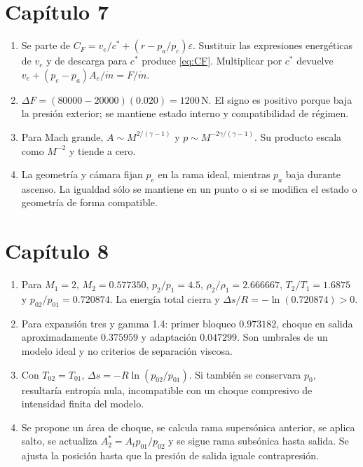 \section*{Capítulo 7}
\begin{enumerate}
\item Se parte de $C_F=v_e/c^*+(r-p_a/p_c)\varepsilon$. Sustituir las expresiones energéticas de $v_e$ y de descarga para $c^*$ produce \eqref{eq:CF}. Multiplicar por $c^*$ devuelve $v_e+(p_e-p_a)A_e/\dot m=F/\dot m$.
\item $\Delta F=(80000-20000)(0.020)=1200\,\mathrm N$. El signo es positivo porque baja la presión exterior; se mantiene estado interno y compatibilidad de régimen.
\item Para Mach grande, $A\sim M^{2/(\gamma-1)}$ y $p\sim M^{-2\gamma/(\gamma-1)}$. Su producto escala como $M^{-2}$ y tiende a cero.
\item La geometría y cámara fijan $p_e$ en la rama ideal, mientras $p_a$ baja durante ascenso. La igualdad sólo se mantiene en un punto o si se modifica el estado o geometría de forma compatible.
\end{enumerate}
\section*{Capítulo 8}
\begin{enumerate}
\item Para $M_1=2$, $M_2=0.577350$, $p_2/p_1=4.5$, $\rho_2/\rho_1=2.666667$, $T_2/T_1=1.6875$ y $p_{02}/p_{01}=0.720874$. La energía total cierra y $\Delta s/R=-\ln(0.720874)>0$.
\item Para expansión tres y gamma 1.4: primer bloqueo $0.973182$, choque en salida aproximadamente $0.375959$ y adaptación $0.047299$. Son umbrales de un modelo ideal y no criterios de separación viscosa.
\item Con $T_{02}=T_{01}$, $\Delta s=-R\ln(p_{02}/p_{01})$. Si también se conservara $p_0$, resultaría entropía nula, incompatible con un choque compresivo de intensidad finita del modelo.
\item Se propone un área de choque, se calcula rama supersónica anterior, se aplica salto, se actualiza $A^*_2=A_t p_{01}/p_{02}$ y se sigue rama subsónica hasta salida. Se ajusta la posición hasta que la presión de salida iguale contrapresión.
\end{enumerate}

